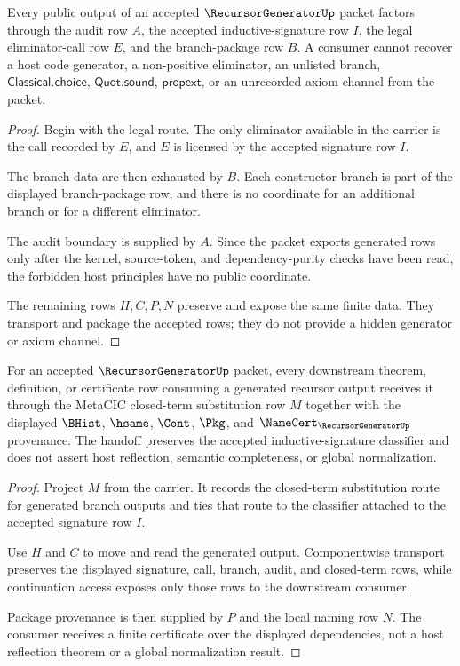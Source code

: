\begin{theorem}
\label{thm:recursor-generator-audit-non-escape}
Every public output of an accepted $\RecursorGeneratorUp$ packet factors through the audit row $A$, the accepted inductive-signature row $I$, the legal eliminator-call row $E$, and the branch-package row $B$. A consumer cannot recover a host code generator, a non-positive eliminator, an unlisted branch, $\mathsf{Classical.choice}$, $\mathsf{Quot.sound}$, $\mathsf{propext}$, or an unrecorded axiom channel from the packet.
\end{theorem}
\begin{proof}
Begin with the legal route. The only eliminator available in the carrier is the call recorded by $E$, and $E$ is licensed by the accepted signature row $I$.

The branch data are then exhausted by $B$. Each constructor branch is part of the displayed branch-package row, and there is no coordinate for an additional branch or for a different eliminator.

The audit boundary is supplied by $A$. Since the packet exports generated rows only after the kernel, source-token, and dependency-purity checks have been read, the forbidden host principles have no public coordinate.

The remaining rows $H,C,P,N$ preserve and expose the same finite data. They transport and package the accepted rows; they do not provide a hidden generator or axiom channel.
\end{proof}

\begin{theorem}
\label{thm:recursor-generator-closed-term-handoff}
For an accepted $\RecursorGeneratorUp$ packet, every downstream theorem, definition, or certificate row consuming a generated recursor output receives it through the MetaCIC closed-term substitution row $M$ together with the displayed $\BHist$, $\hsame$, $\Cont$, $\Pkg$, and $\NameCert_{\RecursorGeneratorUp}$ provenance. The handoff preserves the accepted inductive-signature classifier and does not assert host reflection, semantic completeness, or global normalization.
\end{theorem}
\begin{proof}
Project $M$ from the carrier. It records the closed-term substitution route for generated branch outputs and ties that route to the classifier attached to the accepted signature row $I$.

Use $H$ and $C$ to move and read the generated output. Componentwise transport preserves the displayed signature, call, branch, audit, and closed-term rows, while continuation access exposes only those rows to the downstream consumer.

Package provenance is then supplied by $P$ and the local naming row $N$. The consumer receives a finite certificate over the displayed dependencies, not a host reflection theorem or a global normalization result.
\end{proof}

